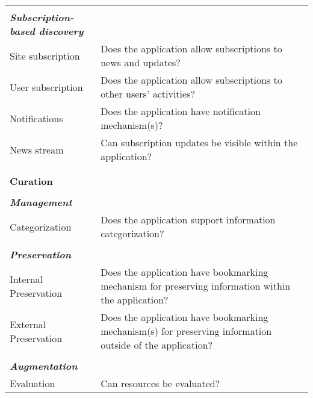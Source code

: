 \documentclass{casconpaper}
\begin{document}
{\begin{table*}[htbp]
\begin{tabular}{|p{0.30\linewidth}|p{0.70\linewidth}|}
&\\
\emph{\textbf{Subscription-based discovery}}          &                                                                                                           \\
Site subscription            & Does the application allow subscriptions to news and updates?                                             \\
User subscription             & Does the application allow subscriptions to other users' activities?                                      \\
Notifications                & Does the application have notification mechanism(s)?                                                      \\
News stream                  & Can subscription updates be visible within the application?  \\
&\\
\hline     
&\\                                        
\textbf{\large{Curation}}                     &                                                                                                        \\
&\\        
\emph{\textbf{Management}}                    &                                                                                                           \\
Categorization               & Does the application support information categorization?                                                  \\
&\\
\emph{\textbf{Preservation}}                   &                                                                                                           \\
Internal Preservation        & Does the application have bookmarking mechanism for preserving information within the application?        \\
External Preservation        & Does the application have bookmarking mechanism(s) for preserving information outside of the application? \\
&\\
\emph{\textbf{Augmentation}}            &                                                                                                           \\
Evaluation                   & Can resources be evaluated?                                                                               \\

\end{tabular}
\end{table*}}
\end{document}

